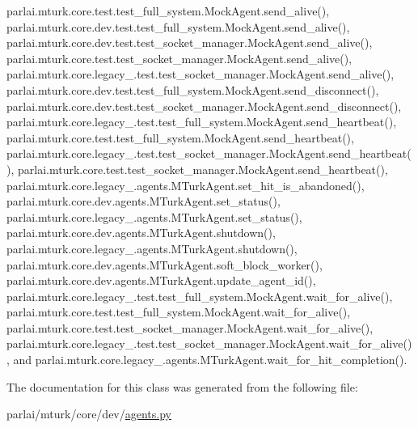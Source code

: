 parlai.\+mturk.\+core.\+test.\+test\+\_\+full\+\_\+system.\+Mock\+Agent.\+send\+\_\+alive(), parlai.\+mturk.\+core.\+dev.\+test.\+test\+\_\+full\+\_\+system.\+Mock\+Agent.\+send\+\_\+alive(), parlai.\+mturk.\+core.\+dev.\+test.\+test\+\_\+socket\+\_\+manager.\+Mock\+Agent.\+send\+\_\+alive(), parlai.\+mturk.\+core.\+test.\+test\+\_\+socket\+\_\+manager.\+Mock\+Agent.\+send\+\_\+alive(), parlai.\+mturk.\+core.\+legacy\+\_.\+test.\+test\+\_\+socket\+\_\+manager.\+Mock\+Agent.\+send\+\_\+alive(), parlai.\+mturk.\+core.\+dev.\+test.\+test\+\_\+full\+\_\+system.\+Mock\+Agent.\+send\+\_\+disconnect(), parlai.\+mturk.\+core.\+dev.\+test.\+test\+\_\+socket\+\_\+manager.\+Mock\+Agent.\+send\+\_\+disconnect(), parlai.\+mturk.\+core.\+legacy\+\_.\+test.\+test\+\_\+full\+\_\+system.\+Mock\+Agent.\+send\+\_\+heartbeat(), parlai.\+mturk.\+core.\+test.\+test\+\_\+full\+\_\+system.\+Mock\+Agent.\+send\+\_\+heartbeat(), parlai.\+mturk.\+core.\+legacy\+\_.\+test.\+test\+\_\+socket\+\_\+manager.\+Mock\+Agent.\+send\+\_\+heartbeat(), parlai.\+mturk.\+core.\+test.\+test\+\_\+socket\+\_\+manager.\+Mock\+Agent.\+send\+\_\+heartbeat(), parlai.\+mturk.\+core.\+legacy\+\_.\+agents.\+M\+Turk\+Agent.\+set\+\_\+hit\+\_\+is\+\_\+abandoned(), parlai.\+mturk.\+core.\+dev.\+agents.\+M\+Turk\+Agent.\+set\+\_\+status(), parlai.\+mturk.\+core.\+legacy\+\_.\+agents.\+M\+Turk\+Agent.\+set\+\_\+status(), parlai.\+mturk.\+core.\+dev.\+agents.\+M\+Turk\+Agent.\+shutdown(), parlai.\+mturk.\+core.\+legacy\+\_.\+agents.\+M\+Turk\+Agent.\+shutdown(), parlai.\+mturk.\+core.\+dev.\+agents.\+M\+Turk\+Agent.\+soft\+\_\+block\+\_\+worker(), parlai.\+mturk.\+core.\+dev.\+agents.\+M\+Turk\+Agent.\+update\+\_\+agent\+\_\+id(), parlai.\+mturk.\+core.\+legacy\+\_.\+test.\+test\+\_\+full\+\_\+system.\+Mock\+Agent.\+wait\+\_\+for\+\_\+alive(), parlai.\+mturk.\+core.\+test.\+test\+\_\+full\+\_\+system.\+Mock\+Agent.\+wait\+\_\+for\+\_\+alive(), parlai.\+mturk.\+core.\+test.\+test\+\_\+socket\+\_\+manager.\+Mock\+Agent.\+wait\+\_\+for\+\_\+alive(), parlai.\+mturk.\+core.\+legacy\+\_.\+test.\+test\+\_\+socket\+\_\+manager.\+Mock\+Agent.\+wait\+\_\+for\+\_\+alive(), and parlai.\+mturk.\+core.\+legacy\+\_.\+agents.\+M\+Turk\+Agent.\+wait\+\_\+for\+\_\+hit\+\_\+completion().



The documentation for this class was generated from the following file\+:\begin{DoxyCompactItemize}
\item 
parlai/mturk/core/dev/\hyperlink{parlai_2mturk_2core_2dev_2agents_8py}{agents.\+py}\end{DoxyCompactItemize}
